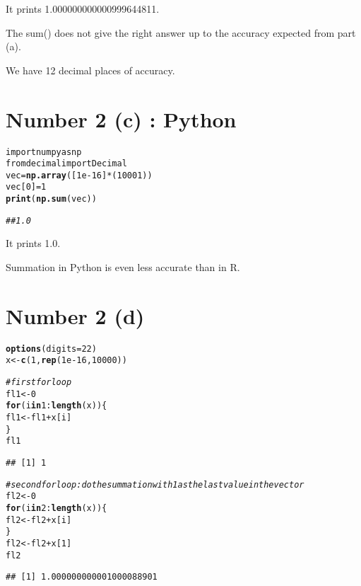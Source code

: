 \documentclass[english]{article}\usepackage[]{graphicx}\usepackage[]{color}
\makeatletter
\newcommand{\hlnum}[1]{\textcolor[rgb]{0.686,0.059,0.569}{#1}}%
\newcommand{\hlcom}[1]{\textcolor[rgb]{0.678,0.584,0.686}{\textit{#1}}}%
\newcommand{\hlopt}[1]{\textcolor[rgb]{0,0,0}{#1}}%
\newcommand{\hlstd}[1]{\textcolor[rgb]{0.345,0.345,0.345}{#1}}%
\newcommand{\hlkwa}[1]{\textcolor[rgb]{0.161,0.373,0.58}{\textbf{#1}}}%
\newcommand{\hlkwb}[1]{\textcolor[rgb]{0.69,0.353,0.396}{#1}}%
\newcommand{\hlkwc}[1]{\textcolor[rgb]{0.333,0.667,0.333}{#1}}%
\newcommand{\hlkwd}[1]{\textcolor[rgb]{0.737,0.353,0.396}{\textbf{#1}}}%
\newenvironment{kframe}{%
 \def\at@end@of@kframe{}%
 \ifinner\ifhmode%
  \def\at@end@of@kframe{\end{minipage}}%
  \begin{minipage}{\columnwidth}%
 \fi\fi%
 \def\FrameCommand##1{\hskip\@totalleftmargin \hskip-\fboxsep
 \colorbox{shadecolor}{##1}\hskip-\fboxsep
     \hskip-\linewidth \hskip-\@totalleftmargin \hskip\columnwidth}%
 \MakeFramed {\advance\hsize-\width
   \@totalleftmargin\z@ \linewidth\hsize
   \@setminipage}}%
 {\par\unskip\endMakeFramed%
 \at@end@of@kframe}
\newenvironment{knitrout}{}{} %
\makeatother
\begin{document}
It prints 1.000000000000999644811.

The sum() does not give the right answer up to the accuracy expected
from part (a).

We have 12 decimal places of accuracy.


\section*{Number 2 (c) : Python}

\begin{knitrout}
\color{fgcolor}\begin{kframe}
\begin{alltt}
import numpy as np 
from decimal import Decimal
vec=\hlkwd{np.array}([1e-16]*(10001)) 
vec[0]=1 
\hlkwd{print} (\hlkwd{np.sum}(vec))

\hlcom{## 1.0}
\end{alltt}
\end{kframe}
\end{knitrout}

It prints 1.0.

Summation in Python is even less accurate than in R.


\section*{Number 2 (d)}

\begin{knitrout}
\color{fgcolor}\begin{kframe}
\begin{alltt}
\hlkwd{options}\hlstd{(}\hlkwc{digits}\hlstd{=}\hlnum{22}\hlstd{)}
\hlstd{x} \hlkwb{<-} \hlkwd{c}\hlstd{(}\hlnum{1}\hlstd{,} \hlkwd{rep}\hlstd{(}\hlnum{1e-16}\hlstd{,} \hlnum{10000}\hlstd{))}

\hlcom{# first for loop}
\hlstd{fl1} \hlkwb{<-} \hlnum{0}
\hlkwa{for} \hlstd{(i} \hlkwa{in} \hlnum{1}\hlopt{:}\hlkwd{length}\hlstd{(x)) \{}
  \hlstd{fl1} \hlkwb{<-} \hlstd{fl1} \hlopt{+} \hlstd{x[i]}
\hlstd{\}}
\hlstd{fl1}
\end{alltt}
\begin{verbatim}
## [1] 1
\end{verbatim}
\begin{alltt}
\hlcom{# second for loop: do the summation with 1 as the last value in the vector}
\hlstd{fl2} \hlkwb{<-} \hlnum{0}
\hlkwa{for} \hlstd{(i} \hlkwa{in} \hlnum{2}\hlopt{:}\hlkwd{length}\hlstd{(x)) \{}
  \hlstd{fl2} \hlkwb{<-} \hlstd{fl2} \hlopt{+} \hlstd{x[i]}
\hlstd{\}}
\hlstd{fl2} \hlkwb{<-} \hlstd{fl2} \hlopt{+} \hlstd{x[}\hlnum{1}\hlstd{]}
\hlstd{fl2}
\end{alltt}
\begin{verbatim}
## [1] 1.000000000001000088901
\end{verbatim}
\end{kframe}
\end{knitrout}
\end{document}

